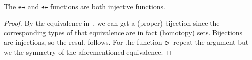 \documentclass[11pt, a4paper, oneside]{amsart}
\begin{document}
\begin{code}[hide]
\AgdaSymbol{)}\AgdaSpace{}%
\AgdaSymbol{(}\AgdaSpace{}%
\AgdaSymbol{)}\AgdaSpace{}%
\AgdaSymbol{(}\AgdaSpace{}%
\AgdaSymbol{(}\AgdaSpace{}%
\AgdaSymbol{)}\AgdaSpace{}%
\AgdaSymbol{(}\AgdaSpace{}%
\AgdaSymbol{)}\AgdaSpace{}%
\AgdaSymbol{(}\AgdaSpace{}%
\AgdaSymbol{))}\AgdaSpace{}%
\AgdaSpace{}%
\AgdaSpace{}%
\<%
\\
%
\>[6]\AgdaSpace{}%
\AgdaSymbol{=}\AgdaSpace{}%
\AgdaSpace{}%
\AgdaSpace{}%
\AgdaSpace{}%
\AgdaSpace{}%
\AgdaSpace{}%
\AgdaSpace{}%
\<%
\end{code}

\begin{proposition}\label{e-gives-injective-functions}
The \texttt{e→} and \texttt{e←} functions are both injective functions.
\end{proposition}

\begin{proof} By the equivalence in~, we can get a
(proper) bijection since the corresponding types of that equivalence are in
fact (homotopy) sets. Bijections are injections, so the result follows. For
the function \texttt{e←} repeat the argument but we the symmetry of the
aforementioned equivalence. \end{proof}
\end{document}
